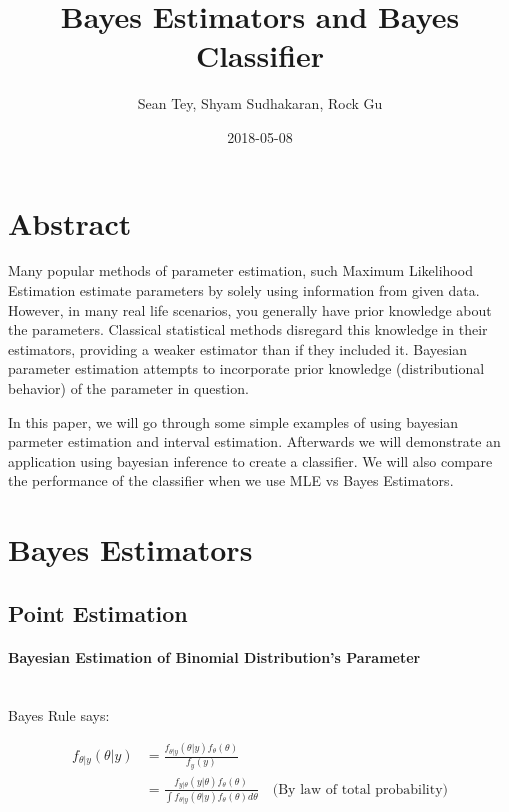 \documentclass{article}
\title{Bayes Estimators and Bayes Classifier}
\date{2018-05-08}
\author{Sean Tey, Shyam Sudhakaran, Rock Gu}
\begin{document}

\maketitle
\newpage

\doublespacing
\tableofcontents
\singlespacing

\newpage


\section{Abstract}

Many popular methods of parameter estimation, such Maximum Likelihood Estimation estimate parameters by solely using information from given data. However, in many real life scenarios, you generally have prior knowledge about the parameters. Classical statistical methods disregard this knowledge in their estimators, providing a weaker estimator than if they included it. Bayesian parameter estimation attempts to incorporate prior knowledge (distributional behavior) of the parameter in question.\newline

In this paper, we will go through some simple examples of using bayesian parmeter estimation and interval estimation. Afterwards we will demonstrate an application using bayesian inference to create a classifier. We will also compare the performance of the classifier when we use MLE vs Bayes Estimators.



\section{Bayes Estimators}

\subsection{Point Estimation}

\paragraph{Bayesian Estimation of Binomial Distribution's Parameter}\mbox{}\\

Bayes Rule says:

\begin{align*} 
f_{\theta|y}(\theta|y) &= \frac{f_{\theta|y}(\theta|y)f_{\theta}(\theta)}{f_{y}(y)} \\
&= \frac{f_{y|\theta}(y|\theta)f_{\theta}(\theta)}{\int f_{\theta|y}(\theta|y)f_{\theta}(\theta) d\theta} \quad \text{(By law of total probability)}
\end{align*}
\end{document}
